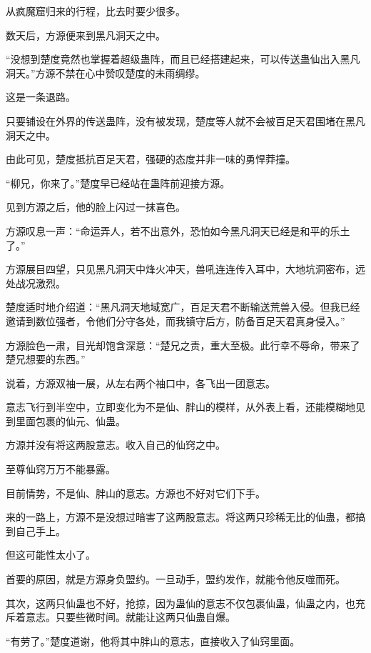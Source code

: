 
\begin{this_body}



从疯魔窟归来的行程，比去时要少很多。

数天后，方源便来到黑凡洞天之中。

“没想到楚度竟然也掌握着超级蛊阵，而且已经搭建起来，可以传送蛊仙出入黑凡洞天。”方源不禁在心中赞叹楚度的未雨绸缪。

这是一条退路。

只要铺设在外界的传送蛊阵，没有被发现，楚度等人就不会被百足天君围堵在黑凡洞天之中。

由此可见，楚度抵抗百足天君，强硬的态度并非一味的勇悍莽撞。

“柳兄，你来了。”楚度早已经站在蛊阵前迎接方源。

见到方源之后，他的脸上闪过一抹喜色。

方源叹息一声：“命运弄人，若不出意外，恐怕如今黑凡洞天已经是和平的乐土了。”

方源展目四望，只见黑凡洞天中烽火冲天，兽吼连连传入耳中，大地坑洞密布，远处战况激烈。

楚度适时地介绍道：“黑凡洞天地域宽广，百足天君不断输送荒兽入侵。但我已经邀请到数位强者，令他们分守各处，而我镇守后方，防备百足天君真身侵入。”

方源脸色一肃，目光却饱含深意：“楚兄之责，重大至极。此行幸不辱命，带来了楚兄想要的东西。”

说着，方源双袖一展，从左右两个袖口中，各飞出一团意志。

意志飞行到半空中，立即变化为不是仙、胖山的模样，从外表上看，还能模糊地见到里面包裹的仙元、仙蛊。

方源并没有将这两股意志。收入自己的仙窍之中。

至尊仙窍万万不能暴露。

目前情势，不是仙、胖山的意志。方源也不好对它们下手。

来的一路上，方源不是没想过暗害了这两股意志。将这两只珍稀无比的仙蛊，都搞到自己手上。

但这可能性太小了。

首要的原因，就是方源身负盟约。一旦动手，盟约发作，就能令他反噬而死。

其次，这两只仙蛊也不好，抢掠，因为蛊仙的意志不仅包裹仙蛊，仙蛊之内，也充斥着意志。只要些微时间。就能让这两只仙蛊自爆。

“有劳了。”楚度道谢，他将其中胖山的意志，直接收入了仙窍里面。


\end{this_body}
